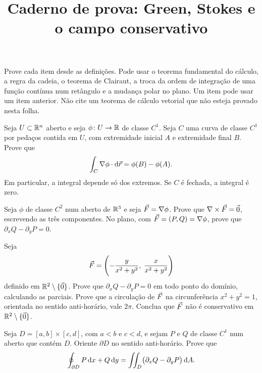 \documentclass[11pt,a4paper]{article}
\title{Caderno de prova: Green, Stokes e o campo conservativo}
\author{}
\date{}
\begin{document}
\maketitle
\tableofcontents

\noindent
Prove cada item desde as definições. Pode usar o teorema fundamental do cálculo, a regra da cadeia, o teorema de Clairaut, a troca da ordem de integração de uma função contínua num retângulo e a mudança polar no plano. Um item pode usar um item anterior. Não cite um teorema de cálculo vetorial que não esteja provado nesta folha.

\begin{exercicio}
Seja $U\subset\mathbb{R}^n$ aberto e seja $\phi\colon U\to\mathbb{R}$ de classe $C^1$. Seja $C$ uma curva de classe $C^1$ por pedaços contida em $U$, com extremidade inicial $A$ e extremidade final $B$. Prove que
\[
\int_C\nabla\phi\cdot\mathrm{d}\vec{r}=\phi(B)-\phi(A).
\]
Em particular, a integral depende só dos extremos. Se $C$ é fechada, a integral é zero.
\end{exercicio}
\vspace{8cm}

\begin{exercicio}
Seja $\phi$ de classe $C^2$ num aberto de $\mathbb{R}^3$ e seja $\vec{F}=\nabla\phi$. Prove que $\nabla\times\vec{F}=\vec{0}$, escrevendo as três componentes. No plano, com $\vec{F}=(P,Q)=\nabla\phi$, prove que $\partial_x Q-\partial_y P=0$.
\end{exercicio}
\vspace{8cm}

\begin{exercicio}
Seja
\[
\vec{F}
=\Biggl(-\frac{y}{x^2+y^2},\;\frac{x}{x^2+y^2}\Biggr)
\]
definido em $\mathbb{R}^2\setminus\{\vec{0}\}$. Prove que $\partial_x Q-\partial_y P=0$ em todo ponto do domínio, calculando as parciais. Prove que a circulação de $\vec{F}$ na circunferência $x^2+y^2=1$, orientada no sentido anti-horário, vale $2\pi$. Conclua que $\vec{F}$ não é conservativo em $\mathbb{R}^2\setminus\{\vec{0}\}$.
\end{exercicio}
\vspace{8cm}

\begin{exercicio}
Seja $D=[a,b]\times[c,d]$, com $a<b$ e $c<d$, e sejam $P$ e $Q$ de classe $C^1$ num aberto que contém $D$. Oriente $\partial D$ no sentido anti-horário. Prove que
\[
\oint_{\partial D} P\,\mathrm{d} x+Q\,\mathrm{d} y
=\iint_D\bigl(\partial_x Q-\partial_y P\bigr)\,\mathrm{d} A.
\]
\end{exercicio}
\vspace{8cm}
\end{document}
